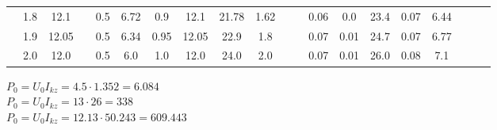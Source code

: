 \documentclass[a4paper,12pt]{article}
\newcommand{\uo}{U_0}
\newcommand{\ik}{I_{kz}}
\newcommand{\po}{P_0}
\begin{document}
\begin{table}[htbp]
\begin{tabular}{|c|c|c|c|c|c|c|c|c|c|c|c|c|c|c|c|c|c|c|c|}
			& 1.8        & 12.1       &                       & 0.5           & 6.72          & 0.9           & 12.1          & 21.78         & 1.62          &                        &                         & 0.06               & 0.0                & 23.4       & 0.07            & 6.44                &                       &                       &                       \\ \cline{2-3} \cline{5-10} \cline{13-17}
			& 1.9        & 12.05      &                       & 0.5           & 6.34          & 0.95          & 12.05         & 22.9          & 1.8           &                        &                         & 0.07               & 0.01               & 24.7       & 0.07            & 6.77                &                       &                       &                       \\ \cline{2-3} \cline{5-10} \cline{13-17}
			& 2.0        & 12.0       &                       & 0.5           & 6.0           & 1.0           & 12.0          & 24.0          & 2.0           &                        &                         & 0.07               & 0.01               & 26.0       & 0.08            & 7.1                 &                       &                       &                       \\ \hline
		\end{tabular}%
	\end{table}

	$\po=\uo\ik=4.5\cdot1.352=6.084$\\
	$\po=\uo\ik=13\cdot26=338$\\
	$\po=\uo\ik=12.13\cdot50.243=609.443$\\
\end{document}
